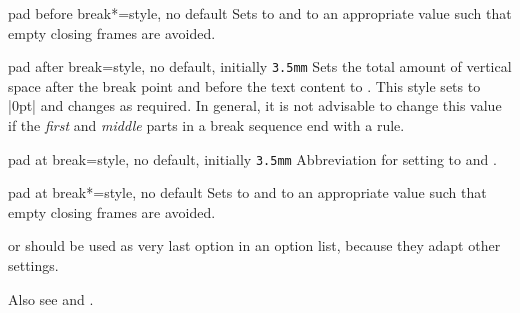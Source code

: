 \begin{docTcbKey}{pad before break*}{=}{style, no default}
  Sets  to  and
   to an appropriate value such that
  empty closing frames are avoided.
\end{docTcbKey}

\begin{docTcbKey}{pad after break}{=}{style, no default, initially \texttt{3.5mm}}
  Sets the total amount of vertical space after the break point and before the
  text content to . This style sets  to |0pt|
  and changes  as required.
  In general, it is not advisable to change this value if the
  \emph{first} and \emph{middle} parts in a break sequence end with a rule.
\end{docTcbKey}

\begin{docTcbKey}{pad at break}{=}{style, no default, initially \texttt{3.5mm}}
  Abbreviation for setting  to 
  and .
\end{docTcbKey}

\begin{docTcbKey}{pad at break*}{=}{style, no default}
  Sets  to  and
   to an appropriate value such that
  empty closing frames are avoided.
\end{docTcbKey}

\begin{dispListing}

\begin{tcolorbox}[enhanced jigsaw,breakable,pad at break*=0mm,
  title={For this box, the pad space at the break point is set to 0mm}]
  \lipsum[1-2]
\end{tcolorbox}
\end{dispListing}
{\tcbusetemp}


\begin{marker}
 or 
should be used as very last option in an option list, because
they adapt other settings.
\end{marker}


\begin{marker}
Also see 
and .
\end{marker}


